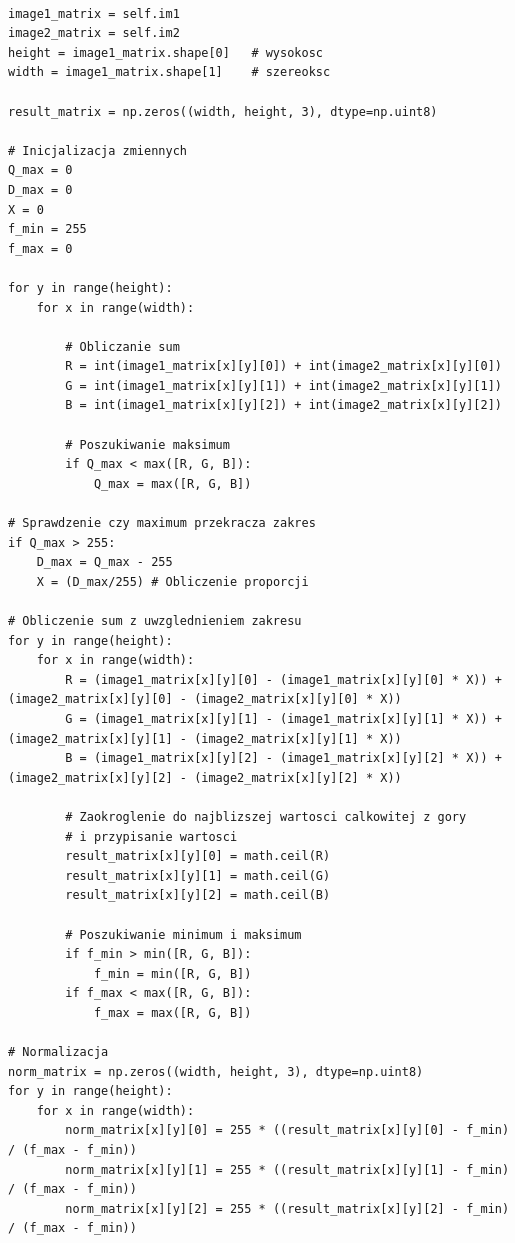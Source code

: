 \documentclass[final,a4paper,openany,12pt]{mwbk}
\begin{document}
\begin{lstlisting}[caption=Sumowanie obrazów barwowych]

image1_matrix = self.im1
image2_matrix = self.im2
height = image1_matrix.shape[0]   # wysokosc
width = image1_matrix.shape[1]    # szereoksc

result_matrix = np.zeros((width, height, 3), dtype=np.uint8)

# Inicjalizacja zmiennych
Q_max = 0
D_max = 0
X = 0
f_min = 255
f_max = 0

for y in range(height):
    for x in range(width):  

        # Obliczanie sum
        R = int(image1_matrix[x][y][0]) + int(image2_matrix[x][y][0])
        G = int(image1_matrix[x][y][1]) + int(image2_matrix[x][y][1])
        B = int(image1_matrix[x][y][2]) + int(image2_matrix[x][y][2])
        
        # Poszukiwanie maksimum               
        if Q_max < max([R, G, B]):
            Q_max = max([R, G, B])

# Sprawdzenie czy maximum przekracza zakres
if Q_max > 255:
    D_max = Q_max - 255
    X = (D_max/255) # Obliczenie proporcji

# Obliczenie sum z uwzglednieniem zakresu
for y in range(height):
    for x in range(width): 
        R = (image1_matrix[x][y][0] - (image1_matrix[x][y][0] * X)) + (image2_matrix[x][y][0] - (image2_matrix[x][y][0] * X))
        G = (image1_matrix[x][y][1] - (image1_matrix[x][y][1] * X)) + (image2_matrix[x][y][1] - (image2_matrix[x][y][1] * X))
        B = (image1_matrix[x][y][2] - (image1_matrix[x][y][2] * X)) + (image2_matrix[x][y][2] - (image2_matrix[x][y][2] * X))

        # Zaokroglenie do najblizszej wartosci calkowitej z gory
        # i przypisanie wartosci
        result_matrix[x][y][0] = math.ceil(R)
        result_matrix[x][y][1] = math.ceil(G)
        result_matrix[x][y][2] = math.ceil(B)

        # Poszukiwanie minimum i maksimum                
        if f_min > min([R, G, B]):
            f_min = min([R, G, B])
        if f_max < max([R, G, B]):
            f_max = max([R, G, B])

# Normalizacja
norm_matrix = np.zeros((width, height, 3), dtype=np.uint8)
for y in range(height):
    for x in range(width):
        norm_matrix[x][y][0] = 255 * ((result_matrix[x][y][0] - f_min) / (f_max - f_min))
        norm_matrix[x][y][1] = 255 * ((result_matrix[x][y][1] - f_min) / (f_max - f_min))
        norm_matrix[x][y][2] = 255 * ((result_matrix[x][y][2] - f_min) / (f_max - f_min))

\end{lstlisting}
\end{document}
